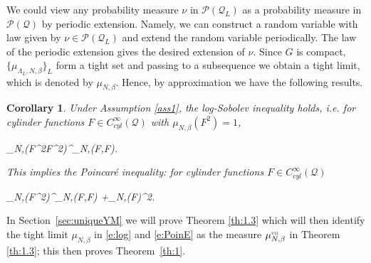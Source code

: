 \documentclass[11pt,UTF-8,reqno]{amsart}
\numberwithin{equation}{section}
\newtheorem{corollary}[theorem]{Corollary}
\newcommand{\eqdef}{\stackrel{\mbox{\tiny def}}{=}}
\def\cE{{\mathcal E}}
\def\cQ{{\mathcal Q}}
\def\cS{{\mathcal S}}
\def\mZ{{\mathbb Z}}
\def\sP{{\mathscr P}}
\def\leq{\leqslant}
\def\bc{\begin{corollary}}
\def\ec{\end{corollary}}
\def\leq{\leqslant}
\def\YM{\textnormal{\tiny \textsc{ym}}}
\def\muYM{\mu^{\YM}_{N,\beta}}
\begin{document}
We could view any probability measure $\nu$ in $\sP(\cQ_L)$ as a probability measure  in $\sP(\cQ)$ by periodic extension. Namely, we can construct a random variable with law given by $\nu \in \sP(\cQ_L)$ and extend the random variable periodically. The law of the periodic extension gives the desired extension of $\nu$.
 Since $G$ is compact,  $\{\mu_{\Lambda_L,N,\beta}\}_{L}$ form a tight set and passing to a subsequence we obtain a tight limit, which is denoted by $\mu_{N,\beta}$.
 Hence, by approximation we have the following results.

 \bc\label{co:lo}
 Under Assumption \ref{ass1},
 the log-Sobolev inequality holds, i.e. for cylinder functions $F\in C^\infty_{cyl}(\cQ)$ with $\mu_{N,\beta}(F^2)=1$,
 \begin{equ}[e:log]
 	\mu_{N,\beta}(F^2\log F^2)\leq \frac2{K_\cS }\cE^{\mu_{N,\beta}}(F,F).
 \end{equ}
This implies the Poincar\'e inequality: for cylinder functions $F\in C^\infty_{cyl}(\cQ)$
 \begin{equ}[e:PoinE]
 	\mu_{N,\beta}(F^2)\leq \frac1{K_\cS }\cE^{\mu_{N,\beta}}(F,F)  +\mu_{N,\beta}(F)^2.
 \end{equ}
 \ec

In Section~\ref{sec:uniqueYM} we will prove Theorem \ref{th:1.3} which will then identify the tight limit
$\mu_{N,\beta}$ in \eqref{e:log} and \eqref{e:PoinE} as the measure $\muYM$ in Theorem \ref{th:1.3}; this then proves Theorem~\ref{th:1}.
\end{document}
